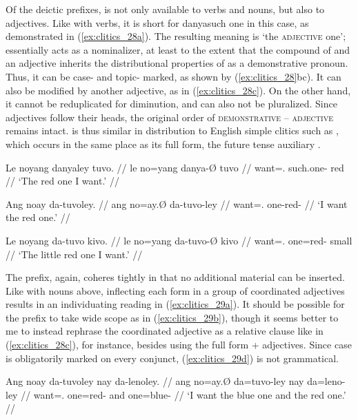 \label{clitics_preadj_da}
Of the deictic prefixes,  is not only available to verbs and
nouns, but also to adjectives. Like with verbs, it is short for 
{danya}{such one} in this case, as demonstrated in (\ref{ex:clitics_28a}). The
resulting meaning is `the \textsc{adjective} one';  essentially
acts as a nominalizer, at least to the extent that the compound of
 and an adjective inherits the distributional properties of
 as a demonstrative pronoun. Thus, it can be case- and topic-
marked, as shown by (\ref{ex:clitics_28}bc). It can also be modified by another
adjective, as in (\ref{ex:clitics_28c}). On the other hand, it cannot be
reduplicated for diminution, and can also not be pluralized. Since adjectives
follow their heads, the original order of \textsc{demonstrative} --
\textsc{adjective} remains intact.  is thus similar in
distribution to English simple clitics such as , which occurs in the
same place as its full form, the future tense auxiliary .

\pex\label{ex:clitics_28}
\a\label{ex:clitics_28a}\begingl
	\gla Le noyang danyaley tuvo. //
	\glb le no=yang danya-Ø tuvo //
	\glc \PatTI{} want=\Fsg{}.\Aarg{} such.one-\Top{} red //
	\glft `The red one I want.' //
\endgl

\a\label{ex:clitics_28b}\begingl
	\gla Ang noay da-tuvoley. //
	\glb ang no=ay.Ø da-tuvo-ley //
	\glc \AgtT{} want=\Fsg{}.\Top{} one-red-\PargI{} //
	\glft `I want the red one.' //
\endgl

\a\label{ex:clitics_28c}\begingl
	\gla Le noyang da-tuvo kivo. //
	\glb le no=yang da-tuvo-Ø kivo //
	\glc \PatTI{} want=\Fsg{}.\Aarg{} one=red-\Top{} small //
	\glft `The little red one I want.' //
\endgl
\xe

The prefix, again, coheres tightly in that no additional material can be
inserted. Like with nouns above, inflecting each form in a group of coordinated
adjectives results in an individuating reading in (\ref{ex:clitics_29a}). It
should be possible for the prefix to take wide scope as in
(\ref{ex:clitics_29b}), though it seems better to me to instead rephrase the
coordinated adjective as a relative clause like in (\ref{ex:clitics_28c}), for
instance, besides using the full form  + adjectives. Since
case is obligatorily marked on every conjunct, (\ref{ex:clitics_29d}) is not
grammatical.

\pex\label{ex:clitics_29}
\a\label{ex:clitics_29a}\begingl
	\gla Ang noay da-tuvoley nay da-lenoley. //
	\glb ang no=ay.Ø da=tuvo-ley nay da=leno-ley //
	\glc \AgtT{} want=\Fsg{}.\Top{} one=red-\PargI{} and one=blue-\PargI{} //
	\glft `I want the blue one and the red one.' //
\endgl

